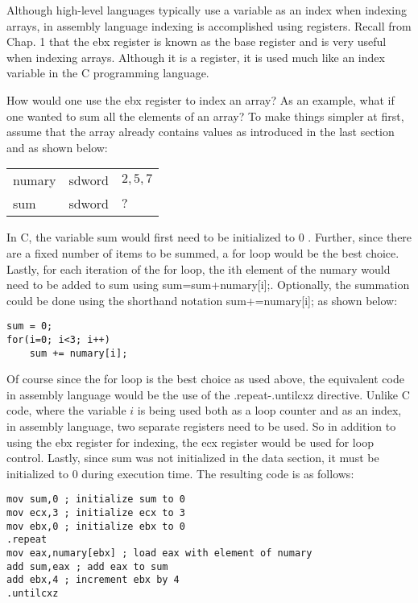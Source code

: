 \documentclass[10pt]{article}
\begin{document}
Although high-level languages typically use a variable as an index when indexing arrays, in assembly language indexing is accomplished using registers. Recall from Chap. 1 that the ebx register is known as the base register and is very useful when indexing arrays. Although it is a register, it is used much like an index variable in the C programming language.

How would one use the ebx register to index an array? As an example, what if one wanted to sum all the elements of an array? To make things simpler at first, assume that the array already contains values as introduced in the last section and as shown below:

\begin{center}
\begin{tabular}{lll}
numary & sdword & $2,5,7$ \\
sum & sdword & $?$ \\
\end{tabular}
\end{center}

In C, the variable sum would first need to be initialized to 0 . Further, since there are a fixed number of items to be summed, a for loop would be the best choice. Lastly, for each iteration of the for loop, the ith element of the numary would need to be added to sum using sum=sum+numary[i];. Optionally, the summation could be done using the shorthand notation sum+=numary[i]; as shown below:

\begin{verbatim}
sum = 0;
for(i=0; i<3; i++)
    sum += numary[i];
\end{verbatim}

Of course since the for loop is the best choice as used above, the equivalent code in assembly language would be the use of the .repeat-.untilcxz directive. Unlike C code, where the variable $i$ is being used both as a loop counter and as an index, in assembly language, two separate registers need to be used. So in addition to using the ebx register for indexing, the ecx register would be used for loop control. Lastly, since sum was not initialized in the data section, it must be initialized to 0 during execution time. The resulting code is as follows:

\begin{verbatim}
mov sum,0 ; initialize sum to 0
mov ecx,3 ; initialize ecx to 3
mov ebx,0 ; initialize ebx to 0
.repeat
mov eax,numary[ebx] ; load eax with element of numary
add sum,eax ; add eax to sum
add ebx,4 ; increment ebx by 4
.untilcxz
\end{verbatim}
\end{document}

